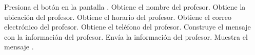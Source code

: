  \begin{UCtrayectoria}

    \UCpaso[\UCactor] Presiona el botón  en la pantalla .
    \UCpaso[\UCsist]  Obtiene el nombre del profesor.
    \UCpaso[\UCsist] Obtiene la ubicación del profesor.
    \UCpaso[\UCsist] Obtiene el horario del profesor.
    \UCpaso[\UCsist]Obtiene el correo electrónico del profesor.
    \UCpaso[\UCsist]  Obtiene el teléfono del profesor.
    \UCpaso[\UCsist] Construye el mensaje con la información del profesor.
    \UCpaso[\UCsist] Envía la información del profesor.
    \UCpaso[\UCsist] Muestra el mensaje .
    

\end{UCtrayectoria}





